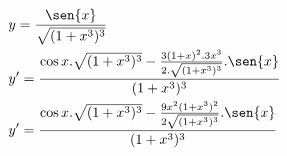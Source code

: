 \begin{ex}
\begin{align}
&y=\frac{\sen{x}}{\sqrt{(1+x^3)^3}}\nonumber\\
&y'=\frac{\cos{x}.\sqrt{(1+x^3)^3}-\frac{3(1+x)^2.3x^3}{2.\sqrt{(1+x^3)^3}}.\sen{x}}{(1+x^3)^3}\nonumber\\
&y'=\frac{\cos{x}.\sqrt{(1+x^3)^3}-\frac{9x^2(1+x^3)^2}{2\sqrt{(1+x^3)^3}}.\sen{x}}{(1+x^3)^3}\nonumber
\end{align}
\end{ex}